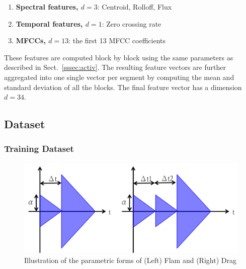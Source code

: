 \documentclass{article}
\begin{document}
\begin{enumerate}
	\item \textbf{Spectral features, $d = 3$}: Centroid, Rolloff, Flux
	\item \textbf{Temporal features, $d = 1$}: Zero crossing rate
	\item \textbf{MFCCs, $d = 13$}: the first 13 MFCC coefficients
\end{enumerate}

These features are computed block by block using the same parameters as described in Sect.~\ref{sssec:activ}. The resulting feature vectors are further aggregated into one single vector per segment by computing the mean and standard deviation of all the blocks. The final feature vector has a dimension $d = 34$. 

%

\subsection{Dataset}
\subsubsection{Training Dataset}
\label{sssec:trainData}

\begin{figure} 
\centering
\includegraphics[width = 6.0 cm]{./figures/signal_model.png}
\caption{Illustration of the parametric forms of (Left) Flam and (Right) Drag}
\label{sigModel}
\end{figure}
\end{document}
